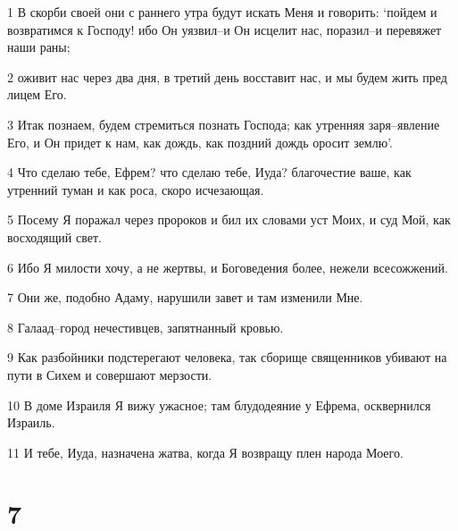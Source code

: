 \par 1 В скорби своей они с раннего утра будут искать Меня и говорить: `пойдем и возвратимся к Господу! ибо Он уязвил--и Он исцелит нас, поразил--и перевяжет наши раны;
\par 2 оживит нас через два дня, в третий день восставит нас, и мы будем жить пред лицем Его.
\par 3 Итак познаем, будем стремиться познать Господа; как утренняя заря--явление Его, и Он придет к нам, как дождь, как поздний дождь оросит землю'.
\par 4 Что сделаю тебе, Ефрем? что сделаю тебе, Иуда? благочестие ваше, как утренний туман и как роса, скоро исчезающая.
\par 5 Посему Я поражал через пророков и бил их словами уст Моих, и суд Мой, как восходящий свет.
\par 6 Ибо Я милости хочу, а не жертвы, и Боговедения более, нежели всесожжений.
\par 7 Они же, подобно Адаму, нарушили завет и там изменили Мне.
\par 8 Галаад--город нечестивцев, запятнанный кровью.
\par 9 Как разбойники подстерегают человека, так сборище священников убивают на пути в Сихем и совершают мерзости.
\par 10 В доме Израиля Я вижу ужасное; там блудодеяние у Ефрема, осквернился Израиль.
\par 11 И тебе, Иуда, назначена жатва, когда Я возвращу плен народа Моего.

\chapter{7}

